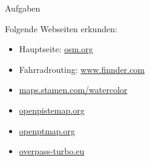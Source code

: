 \documentclass{beamer}
\begin{document}
\begin{frame}{Aufgaben}

  Folgende Webseiten erkunden:

  \begin{itemize}
    \item Hauptseite: \href{https://openstreetmap.org}{osm.org}
    \item Fahrradrouting: \href{http://www.finnder.com}{www.finnder.com}
    \item \href{http://maps.stamen.com/watercolor/}{maps.stamen.com/watercolor}
    \item \href{http://openpistemap.org}{openpistemap.org}
    \item \href{http://openptmap.org}{openptmap.org}
    \item \href{http://overpass-turbo.eu}{overpass-turbo.eu}
  \end{itemize}

\end{frame}
\end{document}
